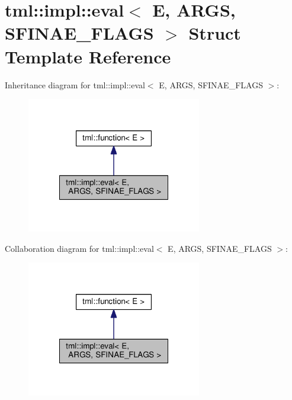 \hypertarget{structtml_1_1impl_1_1eval}{\section{tml\+:\+:impl\+:\+:eval$<$ E, A\+R\+G\+S, S\+F\+I\+N\+A\+E\+\_\+\+F\+L\+A\+G\+S $>$ Struct Template Reference}
\label{structtml_1_1impl_1_1eval}
}


Inheritance diagram for tml\+:\+:impl\+:\+:eval$<$ E, A\+R\+G\+S, S\+F\+I\+N\+A\+E\+\_\+\+F\+L\+A\+G\+S $>$\+:
\nopagebreak
\begin{figure}[H]
\begin{center}
\leavevmode
\includegraphics[width=216pt]{structtml_1_1impl_1_1eval__inherit__graph}
\end{center}
\end{figure}


Collaboration diagram for tml\+:\+:impl\+:\+:eval$<$ E, A\+R\+G\+S, S\+F\+I\+N\+A\+E\+\_\+\+F\+L\+A\+G\+S $>$\+:
\nopagebreak
\begin{figure}[H]
\begin{center}
\leavevmode
\includegraphics[width=216pt]{structtml_1_1impl_1_1eval__coll__graph}
\end{center}
\end{figure}
